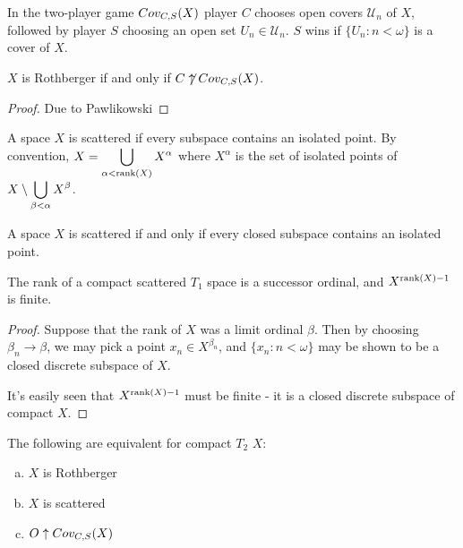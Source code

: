   \begin{definition}
    In the two-player game $Cov_{C,S}(X)$ player $C$ chooses open covers $\mathcal{U}_n$ of $X$, followed by player $S$ choosing an open set $U_n\in\mathcal{U}_n$. $S$ wins if $\{U_n:n<\omega\}$ is a cover of $X$.
  \end{definition}

  \begin{theorem}
    $X$ is Rothberger if and only if $C\not\uparrow Cov_{C,S}(X)$.
  \end{theorem}

  \begin{proof}
    Due to Pawlikowski
  \end{proof}

  \begin{definition}
    A space $X$ is scattered if every subspace contains an isolated point. By convention, $\displaystyle X = \bigcup_{\alpha<\textrm{rank}(X)}X^\alpha$ where $X^\alpha$ is the set of isolated points of $\displaystyle X\setminus\bigcup_{\beta<\alpha}X^\beta$.
  \end{definition}

  \begin{proposition}
    A space $X$ is scattered if and only if every closed subspace contains an isolated point.
  \end{proposition}

  \begin{proposition}
    The rank of a compact scattered $T_1$ space is a successor ordinal, and $X^{\textrm{rank}(X)-1}$ is finite.
  \end{proposition}

  \begin{proof}
    Suppose that the rank of $X$ was a limit ordinal $\beta$. Then by choosing $\beta_n\to\beta$, we may pick a point $x_n\in X^{\beta_n}$, and $\{x_n: n<\omega\}$ may be shown to be a closed discrete subspace of $X$.

    It's easily seen that $X^{\textrm{rank}(X)-1}$ must be finite - it is a closed discrete subspace of compact $X$.
  \end{proof}

  \begin{theorem}
    The following are equivalent for compact $T_2$ $X$:
      \begin{enumerate}[(a)]
        \item $X$ is Rothberger
        \item $X$ is scattered
        \item $O\uparrow Cov_{C,S}(X)$
      \end{enumerate}
  \end{theorem}

